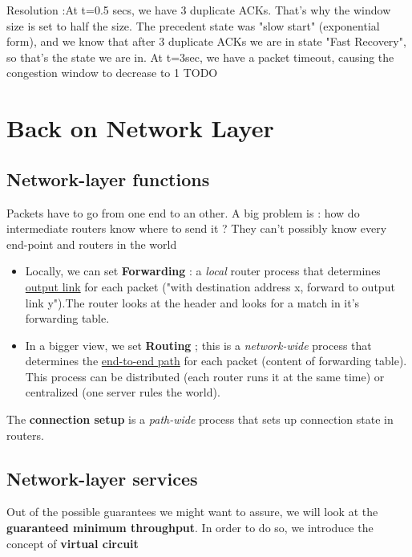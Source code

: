 \documentclass[12pt,a4paper]{article}
\begin{document}
Resolution :At t=0.5 secs, we have 3 duplicate ACKs. That's why the window size is set to half the size. The precedent state was "slow start" (exponential form), and we know that after 3 duplicate ACKs we are in state "Fast Recovery", so that's the state we are in. At t=3sec, we have a packet timeout, causing the congestion window to decrease to 1 TODO
\misenforme
\section{Back on Network Layer}
\subsection{Network-layer functions}
Packets have to go from one end to an other. A big problem is : how do intermediate routers know where to send it ? They can't possibly know every end-point and routers in the world
\begin{itemize}
	\item Locally, we can set \textbf{Forwarding} : a \textit{local} router process that determines \uline{output link} for each packet ("with destination address x, forward to output link y").The router looks at the header and looks for a match in it's forwarding table.
	\item In a bigger view, we set \textbf{Routing} ; this is a \textit{network-wide} process that determines the \uline{end-to-end path} for each packet (content of forwarding table). This process can be distributed (each router runs it at the same time) or centralized (one server rules the world).
\end{itemize}

The \textbf{connection setup} is a \textit{path-wide} process that sets up connection state in routers.

\subsection{Network-layer services}
Out of the possible guarantees we might want to assure, we will look at the \textbf{guaranteed minimum throughput}. In order to do so, we introduce the concept of \textbf{virtual circuit}
\end{document}
